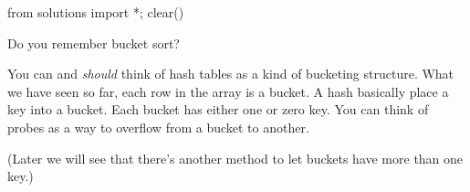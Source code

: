 \begin{python0}
from solutions import *; clear()
\end{python0}

Do you remember bucket sort?

You can and \textit{should} think of hash tables
as a kind of bucketing structure.
What we have seen so far, each row in the array is a bucket.
A hash basically place a key into a bucket.
Each bucket has either one or zero key.
You can think of probes as a way to overflow from a bucket to another.

(Later we will see that there's another method to let buckets
have more than one key.)
\newpage
